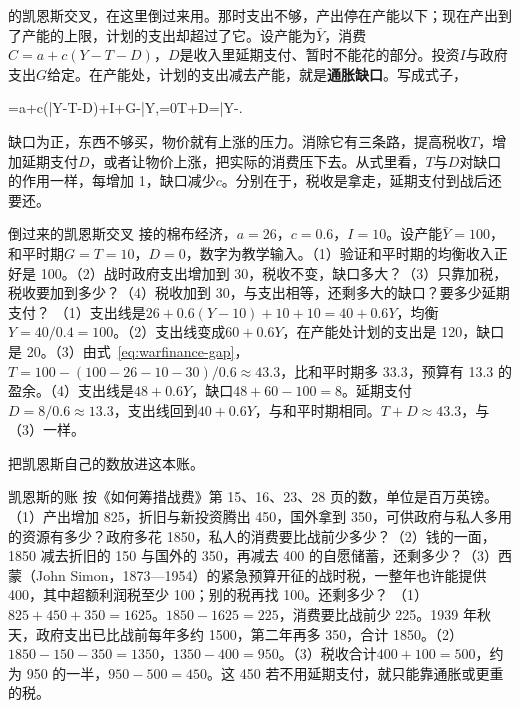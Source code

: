 的凯恩斯交叉，在这里倒过来用。那时支出不够，产出停在产能以下；现在产出到了产能的上限，计划的支出却超过了它。设产能为$\bar Y$，消费$C=a+c(Y-T-D)$，$D$是收入里延期支付、暂时不能花的部分。投资$I$与政府支出$G$给定。在产能处，计划的支出减去产能，就是\textbf{通胀缺口}。写成式子，
\begin{keyeq}
=a+c(\bar Y-T-D)+I+G-\bar Y,\qquad {}=0\iff T+D=\bar Y-.\label{eq:warfinance-gap}
\end{keyeq}
缺口为正，东西不够买，物价就有上涨的压力。消除它有三条路，提高税收$T$，增加延期支付$D$，或者让物价上涨，把实际的消费压下去。从式里看，$T$与$D$对缺口的作用一样，每增加 1，缺口减少$c$。分别在于，税收是拿走，延期支付到战后还要还。

\begin{example}{倒过来的凯恩斯交叉}\label{ex:warfinance-cross}
接的棉布经济，$a=26$，$c=0.6$，$I=10$。设产能$\bar Y=100$，和平时期$G=T=10$，$D=0$，数字为教学输入。（1）验证和平时期的均衡收入正好是 100。（2）战时政府支出增加到 30，税收不变，缺口多大？（3）只靠加税，税收要加到多少？（4）税收加到 30，与支出相等，还剩多大的缺口？要多少延期支付？
\solution
（1）支出线是$26+0.6(Y-10)+10+10=40+0.6Y$，均衡$Y=40/0.4=100$。（2）支出线变成$60+0.6Y$，在产能处计划的支出是 120，缺口是 20。（3）由式~\eqref{eq:warfinance-gap}，$T=100-(100-26-10-30)/0.6\approx43.3$，比和平时期多 33.3，预算有 13.3 的盈余。（4）支出线是$48+0.6Y$，缺口$48+60-100=8$。延期支付$D=8/0.6\approx13.3$，支出线回到$40+0.6Y$，与和平时期相同。$T+D\approx43.3$，与（3）一样。
\end{example}


把凯恩斯自己的数放进这本账。

\begin{example}{凯恩斯的账}\label{ex:warfinance-keynes}
按《如何筹措战费》第 15、16、23、28 页的数，单位是百万英镑。（1）产出增加 825，折旧与新投资腾出 450，国外拿到 350，可供政府与私人多用的资源有多少？政府多花 1850，私人的消费要比战前少多少？（2）钱的一面，1850 减去折旧的 150 与国外的 350，再减去 400 的自愿储蓄，还剩多少？（3）西蒙（John Simon，1873—1954）的紧急预算开征的战时税，一整年也许能提供 400，其中超额利润税至少 100；别的税再找 100。还剩多少？
\solution
（1）$825+450+350=1625$。$1850-1625=225$，消费要比战前少 225。1939 年秋天，政府支出已比战前每年多约 1500，第二年再多 350，合计 1850。（2）$1850-150-350=1350$，$1350-400=950$。（3）税收合计$400+100=500$，约为 950 的一半，$950-500=450$。这 450 若不用延期支付，就只能靠通胀或更重的税。
\end{example}


